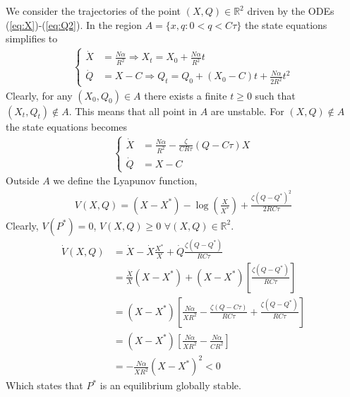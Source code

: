 \documentclass[conference]{IEEEtran}
\begin{document}
\begin{IEEEproof}
We consider the trajectories of the point $(X,Q)\in\mathbb{R}^2$ driven
by the ODEs (\ref{eq:X})-(\ref{eq:Q2}).
In the region $A=\{x,q : 0<q<C\tau\}$ the state equations simplifies to
\begin{align}
\begin{cases}
\dot{X}  &= \frac{N\alpha}{R^2}\Rightarrow X_t = X_0+\frac{N\alpha}{R^2}t\\
\dot{Q}  &= X-C\Rightarrow Q_t=Q_0+(X_0-C)t+\frac{N\alpha}{2R^2}t^2
\end{cases}
\end{align}
Clearly, for any $(X_0,Q_0)\in A$  there exists a finite $t\geq 0$ such that
$(X_t,Q_t)\notin A$. This means that all point in $A$ are unstable.  
For $(X,Q)\notin A$  the state equations becomes
\begin{align}
\begin{cases}
\dot{X}  &= \frac{N\alpha}{R^2}-\frac{\zeta}{C R\tau}(Q-C\tau)X \nonumber\\
\dot{Q}  &= X-C
\end{cases}
\end{align}
Outside $A$ we define the Lyapunov function, 
\begin{align} 
V(X,Q)=(X-X^*)-\log\left(\frac{X}{X^*}\right)+\frac{\zeta (Q-Q^*)^2}{2R C\tau}
\end{align} 
Clearly, $V(P^*)=0$, $V(X,Q)\geq 0$ $\forall (X,Q)\in \mathbb{R}^2$.
\begin{align} 
\dot{V}(X,Q)
&=\dot{X}-\dot{X}\frac{X^*}{X}+\dot{Q}\frac{\zeta(Q-Q^*)}{R C\tau}\nonumber \\
&=\frac{\dot{X}}{X}(X-X^*)+(X-X^*)\left[ \frac{\zeta(Q-Q^*)}{R C\tau}\right]\nonumber \\
&=(X-X^*)\left[\frac{N\alpha}{X R^2}-\frac{\zeta(Q-C\tau)}{RC\tau}+\frac{ \zeta(Q-Q^*)}{RC\tau}\right]\nonumber \\
&=(X-X^*)\left[\frac{N\alpha}{X R^2}-\frac{N\alpha}{C R^2}\right]\nonumber \\
&=-\frac{N\alpha}{X R^2}(X-X^*)^2 <0
\end{align} 
Which states that $P^*$ is an equilibrium globally stable.
\end{IEEEproof}
\end{document}
